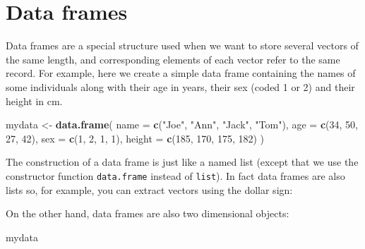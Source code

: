 \documentclass[
]{book}
\newenvironment{Shaded}{\begin{snugshade}}{\end{snugshade}}
\newcommand{\AttributeTok}[1]{\textcolor[rgb]{0.13,0.29,0.53}{#1}}
\newcommand{\DecValTok}[1]{\textcolor[rgb]{0.00,0.00,0.81}{#1}}
\newcommand{\FunctionTok}[1]{\textcolor[rgb]{0.13,0.29,0.53}{\textbf{#1}}}
\newcommand{\NormalTok}[1]{#1}
\newcommand{\OtherTok}[1]{\textcolor[rgb]{0.56,0.35,0.01}{#1}}
\newcommand{\SpecialCharTok}[1]{\textcolor[rgb]{0.81,0.36,0.00}{\textbf{#1}}}
\newcommand{\StringTok}[1]{\textcolor[rgb]{0.31,0.60,0.02}{#1}}
\begin{document}
\section{Data frames}\label{data-frames}

Data frames are a special structure used when we want to store several vectors of the
same length, and corresponding elements of each vector refer to the same record.
For example, here we create a simple data frame containing the names of some individuals
along with their age in years, their sex (coded 1 or 2) and their height in cm.

\begin{Shaded}
\begin{Highlighting}[]
\NormalTok{mydata }\OtherTok{\textless{}{-}} \FunctionTok{data.frame}\NormalTok{(}
  \AttributeTok{name =} \FunctionTok{c}\NormalTok{(}\StringTok{"Joe"}\NormalTok{, }\StringTok{"Ann"}\NormalTok{, }\StringTok{"Jack"}\NormalTok{, }\StringTok{"Tom"}\NormalTok{),}
  \AttributeTok{age =} \FunctionTok{c}\NormalTok{(}\DecValTok{34}\NormalTok{, }\DecValTok{50}\NormalTok{, }\DecValTok{27}\NormalTok{, }\DecValTok{42}\NormalTok{), }
  \AttributeTok{sex =} \FunctionTok{c}\NormalTok{(}\DecValTok{1}\NormalTok{, }\DecValTok{2}\NormalTok{, }\DecValTok{1}\NormalTok{, }\DecValTok{1}\NormalTok{),}
  \AttributeTok{height =} \FunctionTok{c}\NormalTok{(}\DecValTok{185}\NormalTok{, }\DecValTok{170}\NormalTok{, }\DecValTok{175}\NormalTok{, }\DecValTok{182}\NormalTok{)}
\NormalTok{)}
\end{Highlighting}
\end{Shaded}

The construction of a data frame is just like a named list (except
that we use the constructor function \texttt{data.frame} instead of \texttt{list}). In fact data frames are also lists so, for example, you can
extract vectors using the dollar sign:

\begin{Shaded}
\end{Shaded}

On the other hand, data frames are also two dimensional objects:

\begin{Shaded}
\begin{Highlighting}[]
\NormalTok{mydata}
\end{Highlighting}
\end{Shaded}
\end{document}

